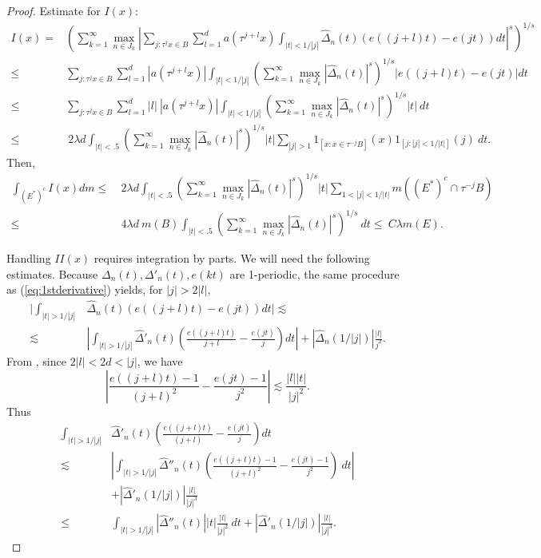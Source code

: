 \documentclass[11pt]{amsart}
\theoremstyle{definition}
\theoremstyle{remark}
\begin{document}
\begin{proof}
Estimate for $I(x)$: 
\begin{align*} I(x)= &
\left(\sum_{k=1}^{\infty} \max_{n\in J_k}
\left| \sum_{j: \tau^jx\in B} \sum_{l=1}^{d}a(\tau^{j+l}x)
\int_{|t|<1/|j|} 
\hat\Delta_n(t) (e((j+l)t)- e(jt) ) dt  \right|^s \right)^{1/s}\\
\le  & 
\sum_{j: \tau^jx\in B} \sum_{l=1}^{d} |a(\tau^{j+l}x)| \int_{|t|<1/|j|}  
\left(\sum_{k=1}^{\infty}  \max_{n\in J_k} |\hat\Delta_n(t)|^s \right)^{1/s}  
|e((j+l)t)- e(jt) | dt  \\
\le  & 
\sum_{j: \tau^jx\in B} \sum_{l=1}^{d} |l| \ |a(\tau^{j+l}x)| \int_{|t|<1/|j|}  
\left(\sum_{k=1}^{\infty} \max_{n\in J_k}  |\hat\Delta_n(t)|^s \right)^{1/s}   |t| \ dt  \\
\le  & \  2\lambda d
\int_{|t|<.5}  
\left(\sum_{k=1}^{\infty} \max_{n\in J_k}  |\hat\Delta_n(t)|^s \right)^{1/s}   |t| \sum_{|j|>1} 1_{[x:x\in \tau^{-j}B]}(x) 1_{[j:|j|<1/|t|]}(j) \ dt . 
\end{align*}
Then, %
\begin{align*}  \int_{(E^*)^c}  I(x) dm 
\le & \ 2\lambda d
\int_{|t|<.5}    
\left(\sum_{k=1}^{\infty}  \max_{n\in J_k} |\hat\Delta_n(t)|^s \right)^{1/s}  |t| \sum_{1<|j|<1/|t|}  m((E^*)^c\cap \tau^{-j}B)  \\
\le & \ 4\lambda d \ m(B)
\int_{|t|<.5}  
\left(\sum_{k=1}^{\infty} \max_{n\in J_k}  |\hat\Delta_n(t)|^s \right)^{1/s}    \ dt   
\le  \ C \lambda m(E).
\end{align*}



Handling $II(x)$ requires integration by parts. We will need the following estimates.
Because $\Delta_n(t),\Delta'_n(t),e(kt)$ are 1-periodic, the same procedure as (\ref{eq:1stderivative})
 yields, for $|j|>2|l|$,
\begin{align*}
| \int_{|t|>1/|j|} &
\hat\Delta_n(t) (e((j+l)t)- e(jt) ) dt | \lesssim  \\
\lesssim &  \left| \int_{|t|>1/|j|} \hat\Delta'_n(t) (\frac{e((j+l)t)}{j+l}- \frac{e(jt)}{j} ) dt \right|
 + \left| \hat\Delta_n(1/|j|) \right| \frac{|l|}{j^2}.
 \end{align*}
 From \cite{BC}, since
$2|l|<2d<|j|$,  we have
\[|\frac{e((j+l)t)-1}{(j+l)^2}- \frac{e(jt)-1}{j^2} | \lesssim \frac{|l||t|}{|j|^2}. \]
Thus
\begin{align*}
\int_{|t|>1/|j|} &
\hat\Delta'_n(t) (\frac{e((j+l)t)}{(j+l)}- \frac{e(jt)}{j} ) dt\\
\lesssim &  \left| \int_{|t|>1/|j|} \hat\Delta''_n(t) (\frac{e((j+l)t)-1}{(j+l)^2}- \frac{e(jt)-1}{j^2} ) \ dt \right|\\
& + \left| \hat\Delta'_n(1/|j|) \right| \frac{|l|}{|j|^3} \\
\le &   \int_{|t|>1/|j|} |\hat\Delta''_n(t)| |t| \frac{|l|}{|j|^2} \ dt+  
\left| \hat\Delta'_n(1/|j|) \right| \frac{|l|}{|j|^3}.
\end{align*}



\end{proof}
\end{document}
